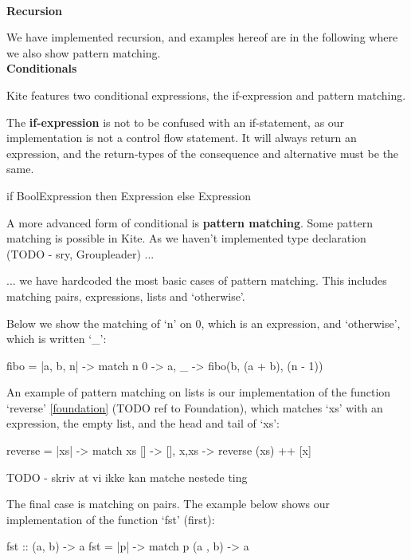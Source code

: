 \label{sec:currying}

\\

\textbf{Recursion} 

We have implemented recursion, and examples hereof are in the following where we also show pattern matching.
\\

\textbf{Conditionals}

Kite features two conditional expressions, the if-expression and pattern matching.



The \textbf{if-expression} is not to be confused with an if-statement, as our implementation is not a control flow statement. It will always return an expression, and the return-types of the consequence and alternative must be the same.


\begin{kite}
  
  if BoolExpression then Expression else Expression
\end{kite}


A more advanced form of conditional is \textbf{pattern matching}. Some pattern matching is possible in Kite. As we haven't implemented type declaration (TODO - sry, Groupleader) ...

... we have hardcoded the most basic cases of pattern matching. This includes matching pairs, expressions, lists and `otherwise'.


Below we show the matching of `n' on 0, which is an expression, and `otherwise', which is written `\_':
\begin{kite}

fibo = |a, b, n| -> {
    match n {
    0 -> a,
    _ -> fibo(b, (a + b), (n - 1))
    }
}
\end{kite}

An example of pattern matching on lists is our implementation of the function `reverse' \ref{foundation} (TODO ref to Foundation), which matches `xs' with an expression, the empty list, and the head and tail of `xs':

\begin{kite}

reverse = |xs| -> {
  match xs {
    []    -> [],
    x,xs  -> reverse (xs) ++ [x]
  }
}

\end{kite}

TODO - skriv at vi ikke kan matche nestede ting

The final case is matching on pairs. The example below shows our implementation of the function `fst' (first):
\begin{kite}

fst :: (a, b) -> a
fst = |p| -> {
  match p {
    (a , b) -> a
  }
}
\end{kite}
\\

